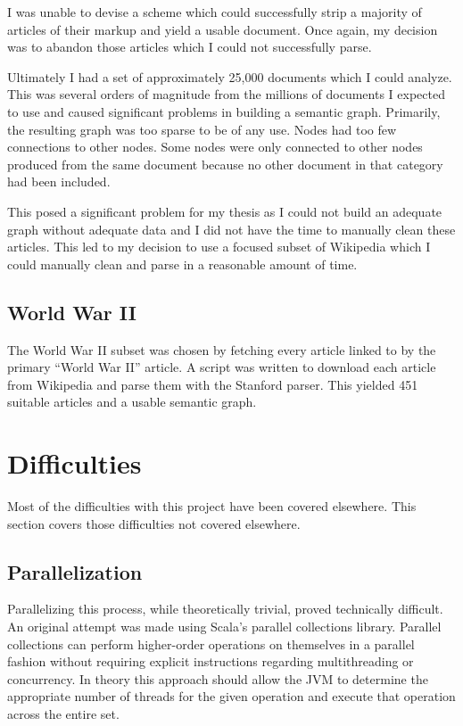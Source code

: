 I was unable to devise a scheme which could successfully strip a majority of articles of their markup and yield a usable document.  Once again, my decision was to abandon those articles which I could not successfully parse.

Ultimately I had a set of approximately 25,000 documents which I could analyze.  This was several orders of magnitude from the millions of documents I expected to use and caused significant problems in building a semantic graph.  Primarily, the resulting graph was too sparse to be of any use.  Nodes had too few connections to other nodes.  Some nodes were only connected to other nodes produced from the same document because no other document in that category had been included.

This posed a significant problem for my thesis as I could not build an adequate graph without adequate data and I did not have the time to manually clean these articles.  This led to my decision to use a focused subset of Wikipedia which I could manually clean and parse in a reasonable amount of time.

\section{World War II}

The World War II subset was chosen by fetching every article linked to by the primary ``World War II'' article.  A script was written to download each article from Wikipedia and parse them with the Stanford parser.  This yielded 451 suitable articles and a usable semantic graph.




\chapter{Difficulties}

Most of the difficulties with this project have been covered elsewhere.  This section covers those difficulties not covered elsewhere.

\section{Parallelization}
\label{sec:difficulties-par}

Parallelizing this process, while theoretically trivial, proved technically difficult.  An original attempt was made using Scala's parallel collections library.  Parallel collections can perform higher-order operations on themselves in a parallel fashion without requiring explicit instructions regarding multithreading or concurrency.  In theory this approach should allow the JVM to determine the appropriate number of threads for the given operation and execute that operation across the entire set.  

